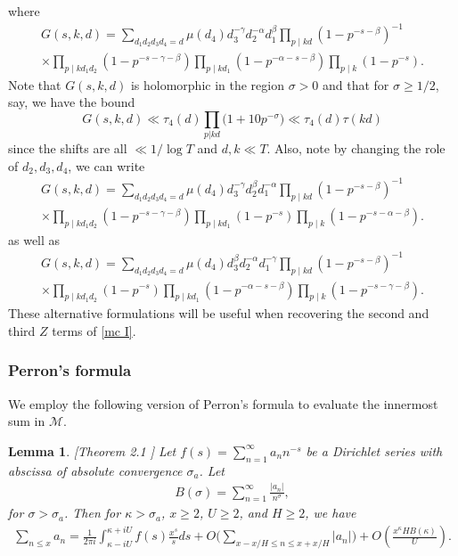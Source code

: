 \documentclass[oneside, 12pt]{amsart}
\newtheorem{lem}[prop]{Lemma}
\theoremstyle{definition}
\newcommand{\geqs}{\geqslant }
\newcommand{\ben}{\begin{equation}}
\newcommand{\een}{\end{equation} }
\begin{document}
where 
\begin{multline}\label{G}
    G(s,k,d)  =  \sum_{d_1d_2d_3d_4=d} \mu(d_4)d_3^{-\gamma}d_2^{-\alpha}d_1^\beta
                       \prod_{p\mid kd} (1-p^{-s-\beta})^{-1}
        \\  \times  \prod_{p\mid kd_1d_2}(1-p^{-s-\gamma-\beta})
                       \prod_{p\mid k d_1} (1-p^{-\alpha-s-\beta})
                       \prod_{p\mid k}(1-p^{-s}).
\end{multline}
Note that $G(s,k,d)$ is holomorphic in the region $\sigma>0$ and that for $\sigma\geqs 1/2$, say, we have the bound 
\ben
\label{G3 bound}
G(s,k,d)\ll \tau_4(d)\prod_{p|kd}\Big(1+10p^{-\sigma}\Big)\ll \tau_4(d)\tau(kd)
\een
since the shifts are all $\ll 1/\log T$ and $d,k\ll T$. 
Also, note by changing the role of $d_2,d_3, d_4$, we can write 
\begin{multline}\label{G2}
G(s,k,d)  =  \sum_{d_1d_2d_3d_4=d} \mu(d_4)d_3^{-\gamma}d_2^{\beta}d_1^{-\alpha}
\prod_{p\mid kd} (1-p^{-s-\beta})^{-1}
\\  \times  \prod_{p\mid kd_1d_2}(1-p^{-s-\gamma-\beta})
\prod_{p\mid k d_1} (1-p^{-s})
\prod_{p\mid k}(1-p^{-s-\alpha-\beta}).
\end{multline}
as well as 
\begin{multline}\label{G3}
G(s,k,d)  =  \sum_{d_1d_2d_3d_4=d} \mu(d_4)d_3^{\beta}d_2^{-\alpha}d_1^{-\gamma}
\prod_{p\mid kd} (1-p^{-s-\beta})^{-1}
\\  \times  \prod_{p\mid kd_1d_2}(1-p^{-s})
\prod_{p\mid k d_1} (1-p^{-\alpha-s-\beta})
\prod_{p\mid k}(1-p^{-s-\gamma-\beta}).
\end{multline}
These alternative formulations will be useful when recovering the second and third $Z$ terms of \eqref{mc I}.






\subsubsection{Perron's formula} We employ the following version of Perron's formula to evaluate the innermost sum in $\mathcal{M}$.


\begin{lem}\label{Perron}[Theorem 2.1 \cite{LiuYe}]
	Let $f(s)=\sum_{n=1}^\infty a_nn^{-s}$ be a Dirichlet series with abscissa of absolute convergence $\sigma_a$. Let  \begin{align}
	B(\sigma)=\sum_{n=1}^\infty \frac{|a_n|}{n^\sigma},
	\end{align}
	for $\sigma>\sigma_a$. Then for $\kappa> \sigma_a$, $x\geq 2$, $U\geq 2$, and $H\geq 2$, we have 
	\begin{align}
	\sum_{n\leq x} a_n= \frac{1}{2\pi i}\int_{\kappa-iU}^{\kappa+iU} f(s)\frac{x^s}{s}ds+ O \bigg( \sum_{ x-x/H \leq n \leq x+x/H}|a_n|\bigg)+ O \left( \frac{x^\kappa H B(\kappa)}{U}\right).
	\end{align}
\end{lem}
\end{document}
